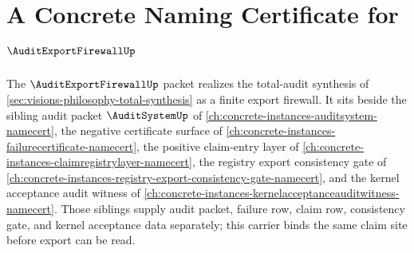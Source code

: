 \chapter{A Concrete Naming Certificate for $\AuditExportFirewallUp$}
\label{ch:concrete-instances-auditexportfirewall-namecert}

The $\AuditExportFirewallUp$ packet realizes the total-audit synthesis of \autoref{sec:visions-philosophy-total-synthesis} as a finite export firewall. It sits beside the sibling audit packet $\AuditSystemUp$ of \autoref{ch:concrete-instances-auditsystem-namecert}, the negative certificate surface of \autoref{ch:concrete-instances-failurecertificate-namecert}, the positive claim-entry layer of \autoref{ch:concrete-instances-claimregistrylayer-namecert}, the registry export consistency gate of \autoref{ch:concrete-instances-registry-export-consistency-gate-namecert}, and the kernel acceptance audit witness of \autoref{ch:concrete-instances-kernelacceptanceauditwitness-namecert}. Those siblings supply audit packet, failure row, claim row, consistency gate, and kernel acceptance data separately; this carrier binds the same claim site before export can be read.

